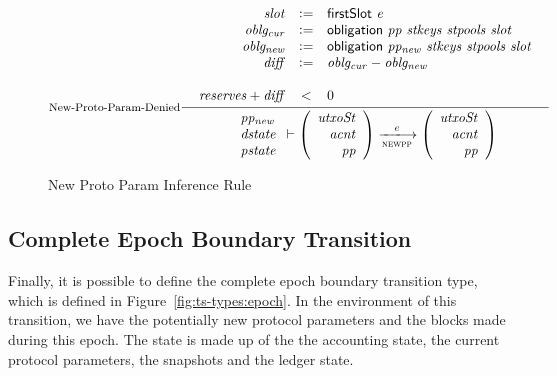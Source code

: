 \begin{figure}[htb]
  \nextdef

  \begin{equation}\label{eq:new-pc-denied}
    \inference[New-Proto-Param-Denied]
    {
      {\begin{array}{rcl}
          \var{slot} & \leteq & \firstSlot{e} \\
          \var{oblg_{cur}} & \leteq & \obligation{pp}{stkeys}{stpools}{slot} \\
          \var{oblg_{new}} & \leteq & \obligation{pp_{new}}{stkeys}{stpools}{slot} \\
          \var{diff} & \leteq & \var{oblg_{cur}} - \var{oblg_{new}} \\
          \\
          \var{reserves} + \var{diff} & < & 0\\
      \end{array}}\\
    }
    {
      \begin{array}{l}
        \var{pp_{new}}\\
        \var{dstate}\\
        \var{pstate}\\
      \end{array}
      \vdash
      \left(
        \begin{array}{r}
          \var{utxoSt} \\
          \var{acnt} \\
          \var{pp}
        \end{array}
      \right)
      \trans{newpp}{e}
      \left(
        \begin{array}{rcl}
          \var{utxoSt} \\
          \var{acnt} \\
          \var{pp}
        \end{array}
      \right)
    }
  \end{equation}
  \caption{New Proto Param Inference Rule}
  \label{fig:rules:new-proto-param}
\end{figure}

\clearpage

\subsection{Complete Epoch Boundary Transition}
\label{sec:total-epoch}

Finally, it is possible to define the complete epoch boundary transition type,
which is defined in Figure~\ref{fig:ts-types:epoch}.
In the environment of this transition, we have the potentially new
protocol parameters and the blocks made during this epoch.  The state is made up of the
the accounting state, the current protocol parameters, the snapshots and the ledger state.

